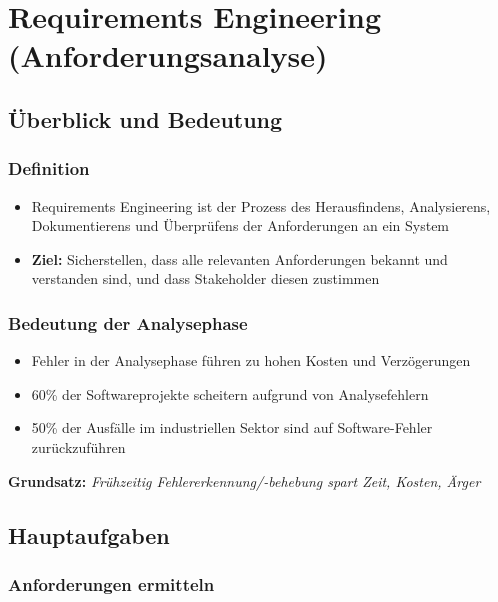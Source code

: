 \documentclass[11pt, a4paper]{article}
\begin{document}
\newpage

\section{Requirements Engineering (Anforderungsanalyse)} %

\subsection{Überblick und Bedeutung}

\subsubsection*{Definition}

\begin{itemize}
    \item Requirements Engineering ist der Prozess des Herausfindens, Analysierens, Dokumentierens und Überprüfens der Anforderungen an ein System
    \item \textbf{Ziel:} Sicherstellen, dass alle relevanten Anforderungen bekannt und verstanden sind, und dass Stakeholder diesen zustimmen
\end{itemize}


\subsubsection*{Bedeutung der Analysephase}

\begin{itemize}
    \item Fehler in der Analysephase führen zu hohen Kosten und Verzögerungen
    \item 60\% der Softwareprojekte scheitern aufgrund von Analysefehlern
    \item 50\% der Ausfälle im industriellen Sektor sind auf Software-Fehler zurückzuführen
\end{itemize}

\textbf{Grundsatz:} \textit{Frühzeitig Fehlererkennung/-behebung spart Zeit, Kosten, Ärger}

\subsection{Hauptaufgaben}

\subsubsection*{Anforderungen ermitteln}
\end{document}
